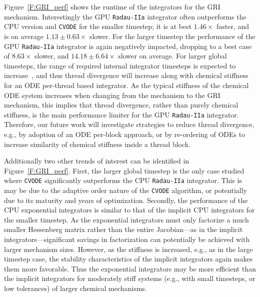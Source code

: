 \documentclass[preprint]{elsarticle}
\begin{document}
Figure~\ref{F:GRI_perf} shows the runtime of the integrators for the GRI mechanism.
Interestingly the GPU \texttt{Radau-IIa} integrator often outperforms the CPU version and \texttt{CVODE} for the smaller timestep; it is at best $1.46\times$ faster, and is on average $1.13\pm0.63\times$ slower.
For the larger timestep the performance of the GPU \texttt{Radau-IIa} integrator is again negatively impacted, dropping to a best case of $8.63\times$ slower, and $14.18\pm6.64\times$ slower on average.
For larger global timesteps, the range of required internal integrator timesteps is expected to increase~\cite{Niemeyer:2014aa}, and thus thread divergence will increase along with chemical stiffness for an ODE per-thread based integrator.
As the typical stiffness of the chemical ODE system increases when changing from the  mechanism to the GRI mechanism, this implies that thread divergence, rather than purely chemical stiffness, is the main performance limiter for the GPU \texttt{Radau-IIa} integrator.
Therefore, our future work will investigate strategies to reduce thread divergence, e.g., by adoption of an ODE per-block approach, or by re-ordering of ODEs to increase similarity of chemical stiffness inside a thread block.

Additionally two other trends of interest can be identified in Figure~\ref{F:GRI_perf}.
First, the larger global timestep is the only case studied where \texttt{CVODE} significantly outperforms the CPU \texttt{Radau-IIa} integrator.
This is may be due to the adaptive order nature of the \texttt{CVODE} algorithm, or potentially due to its maturity and years of optimization.
Secondly, the performance of the CPU exponential integrators is similar to that of the implicit CPU integrators for the smaller timestep.
As the exponential integrators must only factorize a much smaller Hessenberg matrix rather than the entire Jacobian---as in the implicit integrators---significant savings in factorization can potentially be achieved with larger mechanism sizes.
However, as the stiffness is increased, e.g., as in the large timestep case, the stability characteristics of the implicit integrators again makes them more favorable.
Thus the exponential integrators may be more efficient than the implicit integrators for moderately stiff systems (e.g., with small timesteps, or low tolerances) of larger chemical mechanisms.
\end{document}
